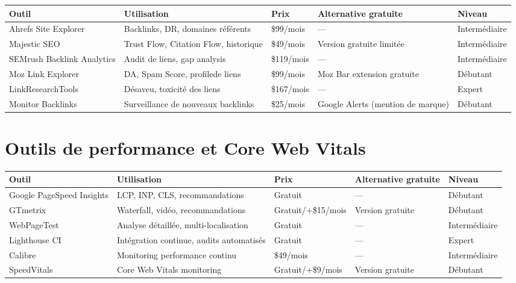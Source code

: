 \documentclass[12pt,a4paper,twoside]{report}
\begin{document}
\begin{center}
\begin{tabularx}{\textwidth}{|p{3cm}|X|p{2cm}|p{2.5cm}|p{1.8cm}|}
\hline
\textbf{Outil} & \textbf{Utilisation} & \textbf{Prix} & \textbf{Alternative gratuite} & \textbf{Niveau} \\
\hline
Ahrefs Site Explorer & Backlinks, DR, domaines référents & \$99/mois & — & Intermédiaire \\
\hline
Majestic SEO & Trust Flow, Citation Flow, historique & \$49/mois & Version gratuite limitée & Intermédiaire \\
\hline
SEMrush Backlink Analytics & Audit de liens, gap analysis & \$119/mois & — & Intermédiaire \\
\hline
Moz Link Explorer & DA, Spam Score, profilede liens & \$99/mois & Moz Bar extension gratuite & Débutant \\
\hline
LinkResearchTools & Désaveu, toxicité des liens & \$167/mois & — & Expert \\
\hline
Monitor Backlinks & Surveillance de nouveaux backlinks & \$25/mois & Google Alerts (mention de marque) & Débutant \\
\hline
\bottomrule
\end{tabularx}
\end{center}

\section*{Outils de performance et Core Web Vitals}

\begin{center}
\begin{tabularx}{\textwidth}{|p{3cm}|X|p{2cm}|p{2.5cm}|p{1.8cm}|}
\hline
\textbf{Outil} & \textbf{Utilisation} & \textbf{Prix} & \textbf{Alternative gratuite} & \textbf{Niveau} \\
\hline
Google PageSpeed Insights & LCP, INP, CLS, recommandations & Gratuit & — & Débutant \\
\hline
GTmetrix & Waterfall, vidéo, recommandations & Gratuit/+\$15/mois & Version gratuite & Débutant \\
\hline
WebPageTest & Analyse détaillée, multi-localisation & Gratuit & — & Intermédiaire \\
\hline
Lighthouse CI & Intégration continue, audits automatisés & Gratuit & — & Expert \\
\hline
Calibre & Monitoring performance continu & \$49/mois & — & Intermédiaire \\
\hline
SpeedVitals & Core Web Vitals monitoring & Gratuit/+\$9/mois & Version gratuite & Débutant \\
\hline
\bottomrule
\end{tabularx}
\end{center}
\end{document}
